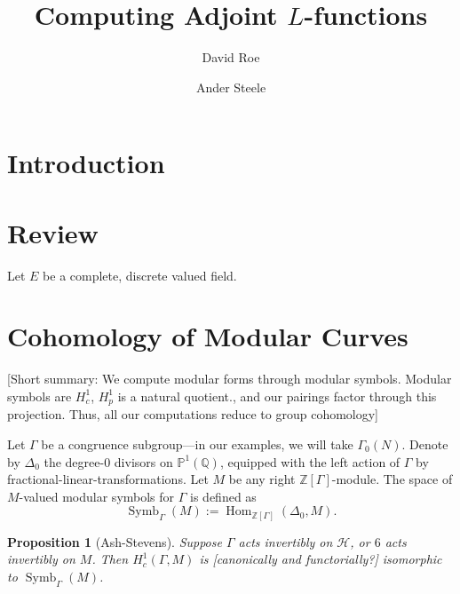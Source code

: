 \documentclass[10pt]{amsart}
\title{Computing Adjoint $L$-functions}
\author{David Roe}
\author{Ander Steele}
\theoremstyle{plain}
\newtheorem{proposition}[theorem]{Proposition}
\theoremstyle{definition}
\newcommand{\ZZ}{{\mathbb{Z}}}
\newcommand{\QQ}{{\mathbb{Q}}}
\newcommand{\cH}{\mathcal{H}}
\DeclareMathOperator{\Hom}{Hom}
\DeclareMathOperator{\Symb}{Symb}
\DeclareMathOperator{\BSymb}{BSymb}
\begin{document}
\maketitle

\section{Introduction}

\section{Review}

Let $E$ be a complete, discrete valued field.  

\section{Cohomology of Modular Curves} \label{sec:mod_curve_cohom}

[Short summary: We compute modular forms through modular symbols. Modular symbols are $H^1_c$, $H^1_p$ is a natural quotient., and our pairings factor through this projection. Thus, all our computations reduce to group cohomology]



Let $\Gamma$ be a congruence subgroup---in our examples, we will take $\Gamma_0(N)$. Denote by $\Delta_0$ the degree-$0$ divisors on $\mathbb{P}^1(\QQ)$, equipped with the left action of $\Gamma$ by fractional-linear-transformations. Let $M$ be any right $\ZZ[\Gamma]$-module. The space of $M$-valued modular symbols for $\Gamma$ is defined as
\begin{equation*}
	\Symb_\Gamma(M) := \Hom_{\ZZ[\Gamma]}(\Delta_0, M).
\end{equation*}

\begin{proposition}[Ash-Stevens]
Suppose $\Gamma$ acts invertibly on $\cH$, or $6$ acts invertibly on $M$. Then $H^1_c(\Gamma,M)$ is [canonically and functorially?] isomorphic to $\Symb_\Gamma(M)$.
\end{proposition}
\end{document}
